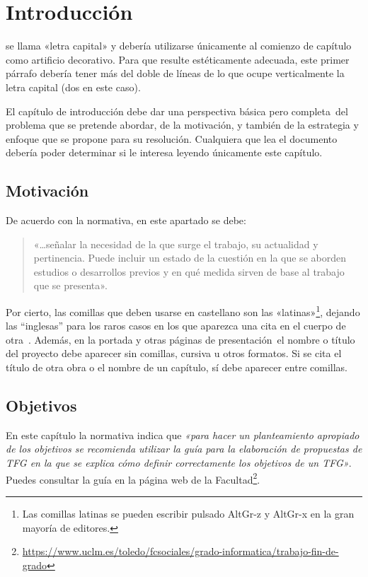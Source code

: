 \chapter{Introducción}

 se llama «letra capital» y debería utilizarse únicamente al comienzo de capítulo como artificio decorativo. Para que resulte estéticamente adecuada, este primer párrafo debería tener más del doble de líneas de lo que ocupe verticalmente la letra capital (dos en este caso).

El capítulo de introducción debe dar una perspectiva básica \textemdash pero completa\textemdash~del problema que se pretende abordar, de la motivación, y también de la estrategia y enfoque que se propone para su resolución. Cualquiera que lea el documento debería poder determinar si le interesa leyendo únicamente este capítulo.

\section{Motivación}

De acuerdo con la normativa, en este apartado se debe:

\begin{quote}
  «\dots señalar la necesidad de la que surge el trabajo, su actualidad y pertinencia. Puede incluir un estado de la cuestión en la que se aborden estudios o desarrollos previos y en qué medida sirven de base al trabajo que se presenta».
\end{quote}

Por cierto, las comillas que deben usarse en castellano son las «latinas»\footnote{Las comillas latinas se pueden escribir pulsado AltGr-z y AltGr-x en la gran mayoría de editores.}, dejando las ``inglesas'' para los raros casos en los que aparezca una cita en el cuerpo de otra~\cite{sousa}. Además, en la portada \textemdash y otras páginas de presentación\textemdash~el nombre o título del proyecto debe aparecer sin comillas, cursiva u otros formatos. Si se cita el título de otra obra o el nombre de un capítulo, sí debe aparecer entre comillas.

\section{Objetivos}

\noindent  %
En este capítulo la normativa indica que \emph{«para hacer un planteamiento apropiado de los objetivos se recomienda utilizar la guía para la elaboración de propuestas de \acf{TFG} en la que se explica cómo definir correctamente los objetivos de un \ac{TFG}»}. Puedes consultar la guía en la página web de la Facultad\footnote{\url{https://www.uclm.es/toledo/fcsociales/grado-informatica/trabajo-fin-de-grado}}.



